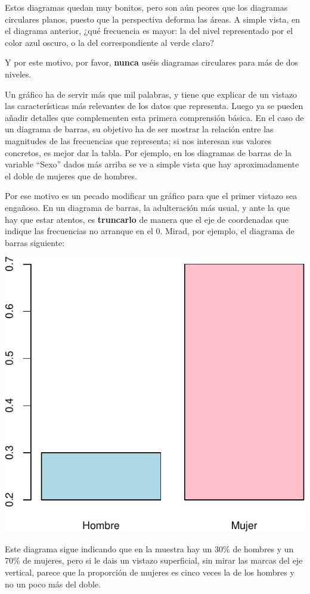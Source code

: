 \documentclass[
]{book}
\theoremstyle{definition}
\theoremstyle{definition}
\theoremstyle{definition}
\theoremstyle{definition}
\theoremstyle{remark}
\begin{document}
Estos diagramas quedan muy bonitos, pero son aún peores que los diagramas circulares planos, puesto que la perspectiva deforma las áreas. A simple vista, en el diagrama anterior, ¿qué frecuencia es mayor: la del nivel representado por el color azul oscuro, o la del correspondiente al verde claro?

\begin{rmdimportant}
Y por este motivo, por favor, \textbf{nunca} uséis diagramas circulares para más de dos niveles.
\end{rmdimportant}

Un gráfico ha de servir más que mil palabras, y tiene que explicar de un vistazo las características más relevantes de los datos que representa. Luego ya se pueden añadir detalles que complementen esta primera comprensión básica. En el caso de un diagrama de barras, su objetivo ha de ser mostrar la relación entre las magnitudes de las frecuencias que representa; si nos interesan sus valores concretos, es mejor dar la tabla. Por ejemplo, en los diagramas de barras de la variable ``Sexo'' dados más arriba se ve a simple vista que hay aproximadamente el doble de mujeres que de hombres.

Por ese motivo es un pecado modificar un gráfico para que el primer vistazo sea engañoso. En un diagrama de barras, la adulteración más usual, y ante la que hay que estar atentos, es \textbf{truncarlo} de manera que el eje de coordenadas que indique las frecuencias no arranque en el 0. Mirad, por ejemplo, el diagrama de barras siguiente:

\begin{center}\includegraphics[width=0.5\linewidth]{INREMDN_files/figure-latex/unnamed-chunk-213-1} \end{center}

Este diagrama sigue indicando que en la muestra hay un 30\% de hombres y un 70\% de mujeres, pero si le dais un vistazo superficial, sin mirar las marcas del eje vertical, parece que la proporción de mujeres es cinco veces la de los hombres y no un poco más del doble.
\end{document}
